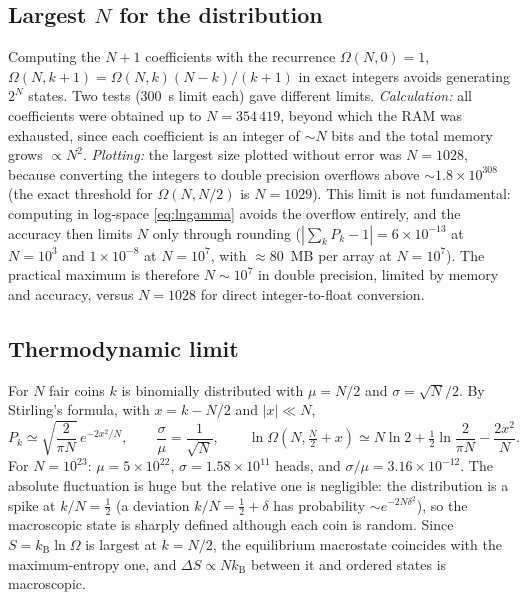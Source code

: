 \documentclass[11pt,a4paper]{article}
\newcommand{\kB}{k_{\mathrm B}}
\newcommand{\Om}{\Omega}
\begin{document}
\subsection{Largest $N$ for the distribution}
Computing the $N+1$ coefficients with the recurrence $\Om(N,0)=1$, $\Om(N,k+1)=\Om(N,k)(N-k)/(k+1)$ in exact integers
avoids generating $2^N$ states. Two tests (300~s limit each) gave different limits.
\emph{Calculation:} all coefficients were obtained up to $N=354\,419$, beyond which the RAM was exhausted, since each coefficient is an
integer of $\sim N$ bits and the total memory grows $\propto N^2$.
\emph{Plotting:} the largest size plotted without error was $N=1028$, because converting the integers to
double precision overflows above $\sim1.8\times10^{308}$ (the exact threshold for $\Om(N,N/2)$ is $N=1029$).
This limit is not fundamental: computing in log-space \eqref{eq:lngamma} avoids the overflow entirely, and the
accuracy then limits $N$ only through rounding ($|\sum_kP_k-1|=6\times10^{-13}$ at $N=10^3$ and $1\times10^{-8}$ at $N=10^7$,
with $\approx80$~MB per array at $N=10^7$). The practical maximum is therefore $N\sim10^7$ in double precision, limited by
memory and accuracy, versus $N=1028$ for direct integer-to-float conversion.

\subsection{Thermodynamic limit}
For $N$ fair coins $k$ is binomially distributed with $\mu=N/2$ and $\sigma=\sqrt N/2$. By Stirling's formula, with $x=k-N/2$ and
$|x|\ll N$,
\begin{equation}
  P_k\simeq\sqrt{\frac{2}{\pi N}}\,e^{-2x^2/N},\qquad
  \frac\sigma\mu=\frac1{\sqrt N},\qquad
  \ln\Om\left(N,\tfrac N2+x\right)\simeq N\ln2+\tfrac12\ln\frac2{\pi N}-\frac{2x^2}{N}.
  \label{eq:gauss}
\end{equation}
For $N=10^{23}$: $\mu=5\times10^{22}$, $\sigma=1.58\times10^{11}$ heads, and $\sigma/\mu=3.16\times10^{-12}$. The
absolute fluctuation is huge but the relative one is negligible: the distribution is a spike at $k/N=\tfrac12$ (a deviation
$k/N=\tfrac12+\delta$ has probability $\sim e^{-2N\delta^2}$), so the macroscopic state is sharply defined although each coin is random.
Since $S=\kB\ln\Om$ is largest at $k=N/2$, the equilibrium macrostate coincides with the maximum-entropy one, and
$\Delta S\propto N\kB$ between it and ordered states is macroscopic.
\end{document}

